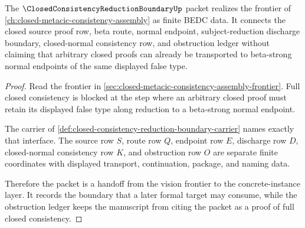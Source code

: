\begin{theorem}
\label{thm:closed-consistency-reduction-boundary-vision-handoff}
The $\ClosedConsistencyReductionBoundaryUp$ packet realizes the frontier of
\autoref{ch:closed-metacic-consistency-assembly} as finite BEDC data. It
connects the closed source proof row, beta route, normal endpoint,
subject-reduction discharge boundary, closed-normal consistency row, and
obstruction ledger without claiming that arbitrary closed proofs can already be
transported to beta-strong normal endpoints of the same displayed false type.
\end{theorem}
\begin{proof}
Read the frontier in
\autoref{sec:closed-metacic-consistency-assembly-frontier}. Full closed
consistency is blocked at the step where an arbitrary closed proof must retain
its displayed false type along reduction to a beta-strong normal endpoint.

The carrier of
\autoref{def:closed-consistency-reduction-boundary-carrier} names exactly that
interface. The source row $S$, route row $Q$, endpoint row $E$, discharge row
$D$, closed-normal consistency row $K$, and obstruction row $O$ are separate
finite coordinates with displayed transport, continuation, package, and naming
data.

Therefore the packet is a handoff from the vision frontier to the
concrete-instance layer. It records the boundary that a later formal target may
consume, while the obstruction ledger keeps the manuscript from citing the
packet as a proof of full closed consistency.
\end{proof}


